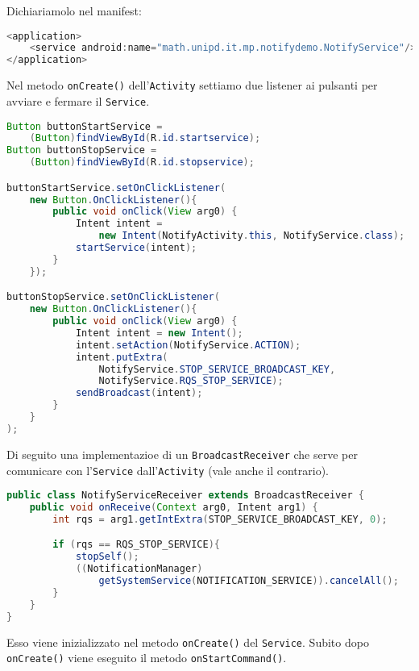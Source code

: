 Dichiariamolo nel manifest:
\begin{lstlisting}[language=Java]
<application>
	<service android:name="math.unipd.it.mp.notifydemo.NotifyService"/>
</application>
\end{lstlisting}

Nel metodo \lstinline|onCreate()| dell'\lstinline|Activity| settiamo due listener ai pulsanti per avviare e fermare il \lstinline|Service|.
\begin{lstlisting}[language=Java]
Button buttonStartService = 
	(Button)findViewById(R.id.startservice);
Button buttonStopService = 
	(Button)findViewById(R.id.stopservice);

buttonStartService.setOnClickListener(
	new Button.OnClickListener(){
		public void onClick(View arg0) {
			Intent intent = 
				new Intent(NotifyActivity.this, NotifyService.class);
			startService(intent);
		}
	});

buttonStopService.setOnClickListener(
	new Button.OnClickListener(){
		public void onClick(View arg0) {
			Intent intent = new Intent();
			intent.setAction(NotifyService.ACTION);
			intent.putExtra(
				NotifyService.STOP_SERVICE_BROADCAST_KEY, 
				NotifyService.RQS_STOP_SERVICE);
			sendBroadcast(intent);
		}
	}
);
\end{lstlisting}

Di seguito una implementazioe di un \lstinline|BroadcastReceiver| che serve per comunicare con l'\lstinline|Service| dall'\lstinline|Activity| (vale anche il contrario).
\begin{lstlisting}[language=Java]
public class NotifyServiceReceiver extends BroadcastReceiver {
	public void onReceive(Context arg0, Intent arg1) {
		int rqs = arg1.getIntExtra(STOP_SERVICE_BROADCAST_KEY, 0);

		if (rqs == RQS_STOP_SERVICE){
			stopSelf();
			((NotificationManager) 
				getSystemService(NOTIFICATION_SERVICE)).cancelAll();
		}
	}
}
\end{lstlisting}

Esso viene inizializzato nel metodo \lstinline|onCreate()| del \lstinline|Service|.
Subito dopo \lstinline|onCreate()| viene eseguito il metodo \lstinline|onStartCommand()|.


